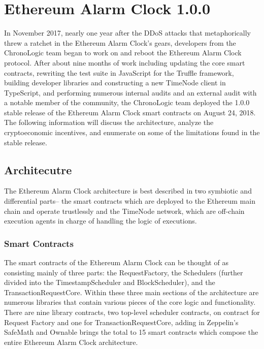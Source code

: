 \documentclass{article}
\begin{document}
  \section{Ethereum Alarm Clock 1.0.0}
  In November 2017, nearly one year after the DDoS attacks that metaphorically threw a ratchet in the Ethereum Alarm Clock’s gears, developers from the ChronoLogic team began to work on and reboot the Ethereum Alarm Clock protocol. After about nine months of work including updating the core smart contracts, rewriting the test suite in JavaScript for the Truffle framework, building developer libraries and constructing a new TimeNode client in TypeScript, and performing numerous internal audits and an external audit with a notable member of the community, the ChronoLogic team deployed the 1.0.0 stable release of the Ethereum Alarm Clock smart contracts on August 24, 2018. The following information will discuss the architecture, analyze the cryptoeconomic incentives, and enumerate on some of the limitations found in the stable release.
  \subsection{Architecutre}
  The Ethereum Alarm Clock architecture is best described in two symbiotic and differential parts-- the smart contracts which are deployed to the Ethereum main chain and operate trustlessly and the TimeNode network, which are off-chain execution agents in charge of handling the logic of executions.
  \subsubsection{Smart Contracts}
  The smart contracts of the Ethereum Alarm Clock can be thought of as consisting mainly of three parts: the RequestFactory, the Schedulers (further divided into the TimestampScheduler and BlockScheduler), and the TransactionRequestCore. Within these three main sections of the architecture are numerous libraries that contain various pieces of the core logic and functionality. There are nine library contracts, two top-level scheduler contracts, on contract for Request Factory and one for TransactionRequestCore, adding in Zeppelin’s SafeMath and Ownable brings the total to 15 smart contracts which compose the entire Ethereum Alarm Clock architecture.
\end{document}
